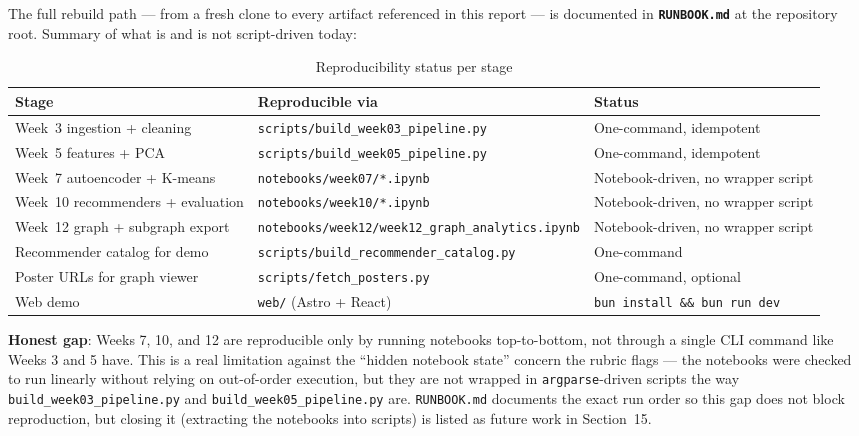 \documentclass[12pt,a4paper]{article}
\begin{document}
The full rebuild path --- from a fresh clone to every artifact referenced in this report --- is
documented in \textbf{\texttt{RUNBOOK.md}} at the repository root. Summary of what is and is not
script-driven today:

\begin{table}[H]
\centering
\caption{Reproducibility status per stage}
\begin{tabular}{p{3.6cm}p{5.4cm}p{4cm}}
\toprule
\textbf{Stage} & \textbf{Reproducible via} & \textbf{Status} \\
\midrule
Week~3 ingestion + cleaning & \texttt{scripts/build\_week03\_pipeline.py} & One-command, idempotent \\
Week~5 features + PCA & \texttt{scripts/build\_week05\_pipeline.py} & One-command, idempotent \\
Week~7 autoencoder + K-means & \texttt{notebooks/week07/*.ipynb} & Notebook-driven, no wrapper script \\
Week~10 recommenders + evaluation & \texttt{notebooks/week10/*.ipynb} & Notebook-driven, no wrapper script \\
Week~12 graph + subgraph export & \texttt{notebooks/week12/week12\_graph\_analytics.ipynb} & Notebook-driven, no wrapper script \\
Recommender catalog for demo & \texttt{scripts/build\_recommender\_catalog.py} & One-command \\
Poster URLs for graph viewer & \texttt{scripts/fetch\_posters.py} & One-command, optional \\
Web demo & \texttt{web/} (Astro + React) & \texttt{bun install \&\& bun run dev} \\
\bottomrule
\end{tabular}
\end{table}

\textbf{Honest gap}: Weeks 7, 10, and 12 are reproducible only by running notebooks top-to-bottom,
not through a single CLI command like Weeks 3 and 5 have. This is a real limitation against the
``hidden notebook state'' concern the rubric flags --- the notebooks were checked to run linearly
without relying on out-of-order execution, but they are not wrapped in \texttt{argparse}-driven
scripts the way \texttt{build\_week03\_pipeline.py} and \texttt{build\_week05\_pipeline.py} are.
\texttt{RUNBOOK.md} documents the exact run order so this gap does not block reproduction, but
closing it (extracting the notebooks into scripts) is listed as future work in Section~15.

\end{document}
